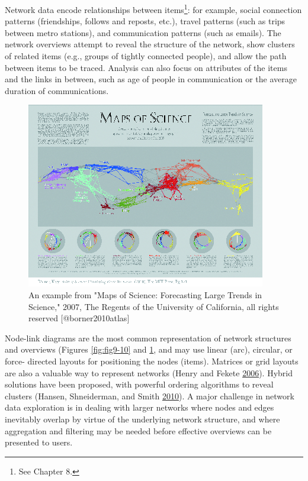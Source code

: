 \documentclass[]{krantz}
\begin{document}
\vspace*{12pt} Network data encode relationships between items\footnote{See
  Chapter 8.}: for example, social connection patterns (friendships,
follows and reposts, etc.), travel patterns (such as trips between metro
stations), and communication patterns (such as emails). The network
overviews attempt to reveal the structure of the network, show clusters
of related items (e.g., groups of tightly connected people), and allow
the path between items to be traced. Analysis can also focus on
attributes of the items and the links in between, such as age of people
in communication or the average duration of communications.

\begin{figure}

{\centering \includegraphics[width=0.7\linewidth]{ChapterViz/figures/fig9-10b} 

}

\caption{An example from "Maps of Science: Forecasting Large Trends in Science," 2007, The Regents of the University of California, all rights reserved [@borner2010atlas]}\label{fig:fig9-10b}
\end{figure}

\vspace*{12pt} {Node-link diagrams} are the most common representation
of network structures and overviews (Figures \ref{fig:fig9-10} and
\ref{fig:fig9-10b}, and may use linear (arc), circular, or force-
directed layouts for positioning the nodes (items). Matrices or grid
layouts are also a valuable way to represent networks (Henry and Fekete
\protect\hyperlink{ref-henry2006matrixexplorer}{2006}). Hybrid solutions
have been proposed, with powerful ordering algorithms to reveal clusters
(Hansen, Shneiderman, and Smith
\protect\hyperlink{ref-hansen2010analyzing}{2010}). A major challenge in
network data exploration is in dealing with larger networks where nodes
and edges inevitably overlap by virtue of the underlying network
structure, and where aggregation and filtering may be needed before
effective overviews can be presented to users.
\end{document}
